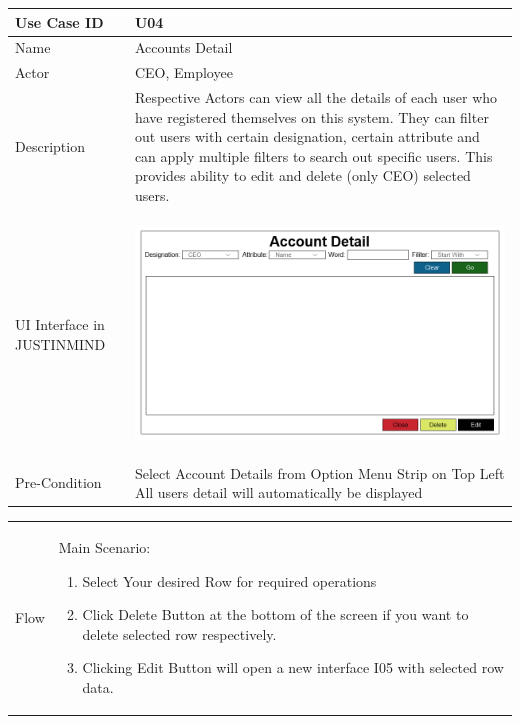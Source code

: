\documentclass[12pt,a4paper]{report}
\begin{document}
\begin{tabular}{ | m{3cm} | m{12cm}| } \hline

Use Case ID & U04  \\\hline

Name  	    & Accounts Detail  \\ \hline

Actor     	& CEO, Employee \\ \hline

Description & Respective Actors can view all the details of each user who have registered themselves on this system. They can filter out users with certain designation, certain attribute and can apply multiple filters to search out specific users. This provides ability to edit and delete (only CEO) selected users.  \\ \hline

UI Interface in JUSTINMIND & \begin{center} \includegraphics[scale=0.3]{./UIs for Latex Reports/UI-006 ViewsAndDelete Account@1x.png}\end{center}  \\ \hline

Pre-Condition &  Select Account Details from Option Menu Strip on Top Left
All users detail will automatically be displayed
 \\ \hline

\end{tabular} \newpage \begin{tabular}{ | m{3cm} | m{12cm}| }  \hline
Flow & Main Scenario:

\begin{enumerate}
\item   Select Your desired Row for required operations
\item  Click Delete Button at the bottom of the screen if you want to delete selected row respectively. 
\item  Clicking Edit Button will open a new interface I05 with selected row data.



\end{enumerate}
\end{tabular}
\end{document}
